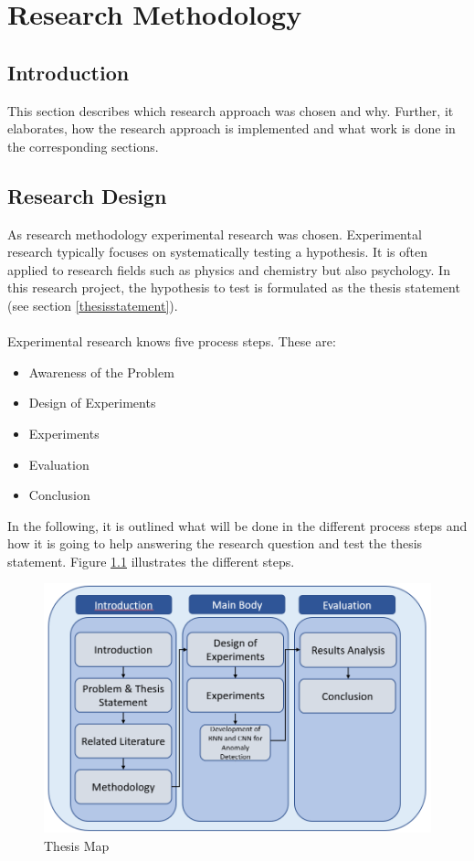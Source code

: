 
\chapter{Research Methodology} %

\section{Introduction}
This section describes which research approach was chosen and why. Further, it elaborates, how the research approach is implemented and what work is done in the corresponding sections. 

\section{Research Design}
As research methodology experimental research was chosen. Experimental research typically focuses on systematically testing a hypothesis. It is often applied to research fields such as physics and chemistry but also psychology. In this research project, the hypothesis to test is formulated as the thesis statement (see section \ref{thesisstatement}).\\
\\
Experimental research knows five process steps. These are:

\begin{itemize}
	\item Awareness of the Problem
	\item Design of Experiments
	\item Experiments
	\item Evaluation
	\item Conclusion
\end{itemize}

In the following, it is outlined what will be done in the different process steps and how it is going to help answering the research question and test the thesis statement. Figure \ref{Thesis Map} illustrates the different steps.

\begin{figure}[h]
	\centering
	\includegraphics[scale=0.5]{Figures/Thesis Map}
	\decoRule
	\caption[Thesis Map]{Thesis Map \parencite{own}}
	\label{Thesis Map}
\end{figure}

